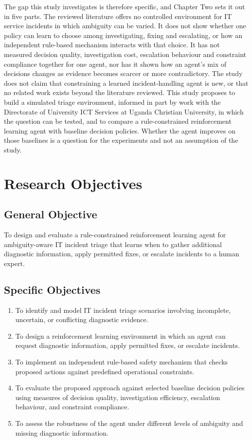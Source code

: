 The gap this study investigates is therefore specific, and Chapter Two sets it out in five parts. The reviewed literature offers no controlled environment for IT service incidents in which ambiguity can be varied. It does not show whether one policy can learn to choose among investigating, fixing and escalating, or how an independent rule-based mechanism interacts with that choice. It has not measured decision quality, investigation cost, escalation behaviour and constraint compliance together for one agent, nor has it shown how an agent's mix of decisions changes as evidence becomes scarcer or more contradictory. The study does not claim that constraining a learned incident-handling agent is new, or that no related work exists beyond the literature reviewed. This study proposes to build a simulated triage environment, informed in part by work with the Directorate of University ICT Services at Uganda Christian University, in which the question can be tested, and to compare a rule-constrained reinforcement learning agent with baseline decision policies. Whether the agent improves on those baselines is a question for the experiments and not an assumption of the study.

\section{Research Objectives}

\subsection{General Objective}

To design and evaluate a rule-constrained reinforcement learning agent for ambiguity-aware IT incident triage that learns when to gather additional diagnostic information, apply permitted fixes, or escalate incidents to a human expert.

\subsection{Specific Objectives}

\begin{enumerate}
  \item To identify and model IT incident triage scenarios involving incomplete, uncertain, or conflicting diagnostic evidence.
  \item To design a reinforcement learning environment in which an agent can request diagnostic information, apply permitted fixes, or escalate incidents.
  \item To implement an independent rule-based safety mechanism that checks proposed actions against predefined operational constraints.
  \item To evaluate the proposed approach against selected baseline decision policies using measures of decision quality, investigation efficiency, escalation behaviour, and constraint compliance.
  \item To assess the robustness of the agent under different levels of ambiguity and missing diagnostic information.
\end{enumerate}

